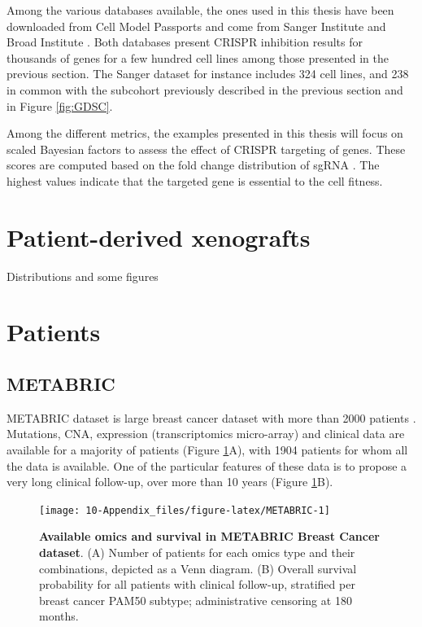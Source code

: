 \documentclass[a4paper,12pt,twoside,onecolumn,openright,final,oldfontcommands]{memoir}
\begin{document}
Among the various databases available, the ones used in this thesis have
been downloaded from Cell Model Passports and come from Sanger Institute
\citep{behan2019prioritization} and Broad Institute
\citep{meyers2017computational}. Both databases present CRISPR
inhibition results for thousands of genes for a few hundred cell lines
among those presented in the previous section. The Sanger dataset for
instance includes 324 cell lines, and 238 in common with the subcohort
previously described in the previous section and in Figure
\ref{fig:GDSC}.

Among the different metrics, the examples presented in this thesis will
focus on scaled Bayesian factors to assess the effect of CRISPR
targeting of genes. These scores are computed based on the fold change
distribution of sgRNA \citep{hart2016bagel}. The highest values indicate
that the targeted gene is essential to the cell fitness.

\section{Patient-derived xenografts}\label{patient-derived-xenografts}

Distributions and some figures

\section{Patients}\label{appendix-datasets-patients}

\subsection{METABRIC}\label{metabric}

METABRIC dataset is large breast cancer dataset with more than 2000
patients \citep{pereira2016somatic}. Mutations, CNA, expression
(transcriptomics micro-array) and clinical data are available for a
majority of patients (Figure \ref{fig:METABRIC}A), with 1904 patients
for whom all the data is available. One of the particular features of
these data is to propose a very long clinical follow-up, over more than
10 years (Figure \ref{fig:METABRIC}B).

\begin{figure}

{\centering \texttt{[image: 10-Appendix\_files/figure-latex/METABRIC-1]} 

}

\caption[Available omics and survival in METABRIC Breast Cancer dataset]{\textbf{Available omics and survival in METABRIC
Breast Cancer dataset}. (A) Number of patients for each omics type and
their combinations, depicted as a Venn diagram. (B) Overall survival
probability for all patients with clinical follow-up, stratified per
breast cancer PAM50 subtype; administrative censoring at 180 months.}\label{fig:METABRIC}
\end{figure}
\end{document}
